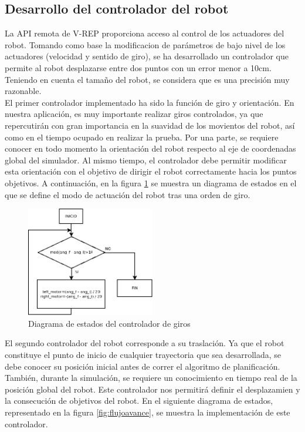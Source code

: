 \subsection{Desarrollo del controlador del robot}

La API remota de V-REP proporciona acceso al control de los actuadores del robot. Tomando como base la modificacion de parámetros de bajo nivel de los actuadores (velocidad y sentido de giro), se ha desarrollado un controlador que permite al robot desplazarse entre dos puntos con un error menor a 10cm. Teniendo en cuenta el tamaño del robot, se considera que es una precisión muy razonable.\\

El primer controlador implementado ha sido la función de giro y orientación. En nuestra aplicación, es muy importante realizar giros controlados, ya que repercutirán con gran importancia en la suavidad de los movientos del robot, así como en el tiempo ocupado en realizar la prueba. Por una parte, se requiere conocer en todo momento la orientación del robot respecto al eje de coordenadas global del simulador. Al mismo tiempo, el controlador debe permitir modificar esta orientación con el objetivo de dirigir el robot correctamente hacia los puntos objetivos. A continuación, en la figura \ref{fig:flujogiro} se muestra un diagrama de estados en el que se define el modo de actuación del robot tras una orden de giro.\\

\begin{figure}[H]
		\centering
        \includegraphics[width=0.5\textwidth]{images/flujogiro.png}
        \caption{Diagrama de estados del controlador de giros}
        \label{fig:flujogiro}
\end{figure} 

El segundo controlador del robot corresponde a su traslación. Ya que el robot constituye el punto de inicio de cualquier trayectoria que sea desarrollada, se debe conocer su posición inicial antes de correr el algoritmo de planificación. También, durante la simulación, se requiere un conocimiento en tiempo real de la posición global del robot. Este controlador nos permitirá definir el desplazamien y la consecución de objetivos del robot. En el siguiente diagrama de estados, representado en la figura \ref{fig:flujoavance}, se muestra la implementación de este controlador.

